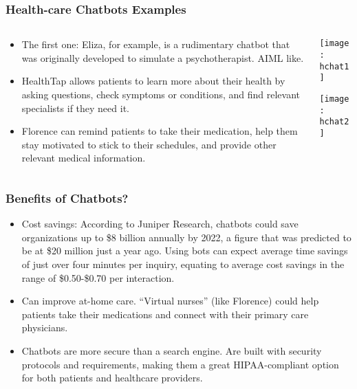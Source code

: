 \begin{frame}[fragile]\frametitle{Health-care Chatbots Examples}

\begin{columns}
\begin{column}[T]{0.5\linewidth}
\begin{itemize}
\item The first one: Eliza, for example, is a rudimentary chatbot that was originally developed to simulate a psychotherapist. AIML like.
\item HealthTap allows patients to learn more about their health by asking questions, check symptoms or conditions, and find relevant specialists if they need it.
\item Florence can remind patients to take their medication, help them stay motivated to stick to their schedules, and provide other relevant medical information.
\end{itemize}
\end{column}
\begin{column}[T]{0.5\linewidth}

\begin{center}
\texttt{[image: hchat1]}

\texttt{[image: hchat2]}
\end{center}

\end{column}

\end{columns}

\end{frame}

\begin{frame}[fragile]\frametitle{Benefits of Chatbots?}

\begin{itemize}
\item Cost savings: According to Juniper Research, chatbots could save organizations up to \$8 billion annually by 2022, a figure that was predicted to be at \$20 million just a year ago. Using bots can expect average time savings of just over four minutes per inquiry, equating to average cost savings in the range of \$0.50-\$0.70 per interaction.
\item Can improve at-home care.  ``Virtual nurses'' (like Florence) could help patients take their medications and connect with their primary care physicians.
\item Chatbots are more secure than a search engine. Are built with security protocols and requirements, making them a great HIPAA-compliant option for both patients and healthcare providers.
\end{itemize}


\end{frame}

